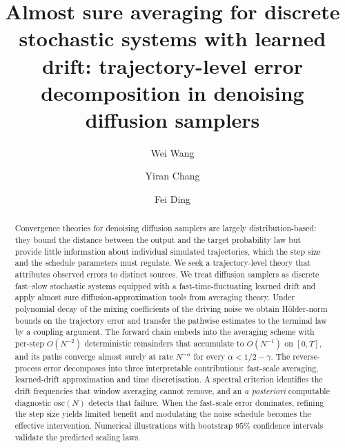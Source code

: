 \documentclass[a4paper,fleqn]{cas-dc}
\theoremstyle{definition}
\begin{document}
\let\WriteBookmarks\relax
\def\floatpagepagefraction{1}
\def\textpagefraction{.001}


\title[mode=title]{Almost sure averaging for discrete stochastic systems with
learned drift: trajectory-level error decomposition in denoising diffusion samplers}

\author[1,2,3]{Wei Wang}
\cormark[1]

\author[3]{Yiran Chang}

\author[2]{Fei Ding}






\begin{abstract}
Convergence theories for denoising diffusion samplers are largely
distribution-based: they bound the distance between the output and the target
probability law but provide little information about individual simulated
trajectories, which the step size and the schedule parameters must regulate. We
seek a trajectory-level theory that attributes observed errors to distinct
sources. We treat diffusion samplers as discrete fast--slow stochastic systems
equipped with a fast-time-fluctuating learned drift and apply almost sure
diffusion-approximation tools from averaging theory. Under polynomial decay of
the mixing coefficients of the driving noise we obtain H\"older-norm bounds on
the trajectory error and transfer the pathwise estimates to the terminal law by
a coupling argument. The forward chain embeds into the averaging scheme with
per-step $O(N^{-2})$ deterministic remainders that accumulate to $O(N^{-1})$ on
$[0,T]$, and its paths converge almost surely at rate $N^{-\alpha}$ for every
$\alpha<1/2-\gamma$. The reverse-process error decomposes into three
interpretable contributions: fast-scale averaging, learned-drift approximation
and time discretisation. A spectral criterion identifies the drift frequencies
that window averaging cannot remove, and an \emph{a posteriori} computable
diagnostic $\mathrm{osc}(N)$ detects that failure. When the fast-scale error
dominates, refining the step size yields limited benefit and modulating the
noise schedule becomes the effective intervention. Numerical illustrations with
bootstrap $95\%$ confidence intervals validate the predicted scaling laws.
\end{abstract}
\end{document}

